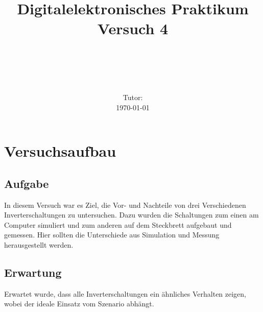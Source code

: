 \documentclass[11pt, a4paper]{article}
\title{\textbf{Digitalelektronisches Praktikum\\ Versuch 4}}
\author{\ATutantName \\ \emph{\ATutantEmail} \and \BTutantName\\ \emph{\BTutantEmail}}
\date{\Gruppennummer \\[3ex] Tutor: \Tutorname \\[3ex] \today}
\begin{document}
\clearpage
\maketitle
\thispagestyle{empty}
\newpage


\section*{Versuchsaufbau}
\subsection*{Aufgabe}
In diesem Versuch war es Ziel, die Vor- und Nachteile von drei Verschiedenen Inverterschaltungen zu untersuchen. Dazu wurden die Schaltungen zum einen am Computer simuliert und zum anderen auf dem Steckbrett aufgebaut und gemessen. Hier sollten die Unterschiede aus Simulation und Messung herausgestellt werden.
\subsection*{Erwartung}
Erwartet wurde, dass alle Inverterschaltungen ein ähnliches Verhalten zeigen, wobei der ideale Einsatz vom Szenario abhängt.
\end{document}
